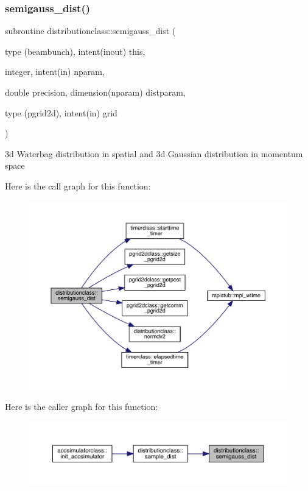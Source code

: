 \subsubsection{\texorpdfstring{semigauss\_dist()}{semigauss\_dist()}}
{\footnotesize\ttfamily subroutine distributionclass\+::semigauss\+\_\+dist (\begin{DoxyParamCaption}\item[{type (beambunch), intent(inout)}]{this,  }\item[{integer, intent(in)}]{nparam,  }\item[{double precision, dimension(nparam)}]{distparam,  }\item[{type (pgrid2d), intent(in)}]{grid }\end{DoxyParamCaption})}



3d Waterbag distribution in spatial and 3d Gaussian distribution in momentum space 

Here is the call graph for this function\+:\nopagebreak
\begin{figure}[H]
\begin{center}
\leavevmode
\includegraphics[width=350pt]{namespacedistributionclass_a5ae8e13c52291510b7b0b6fe333db73f_cgraph}
\end{center}
\end{figure}
Here is the caller graph for this function\+:\nopagebreak
\begin{figure}[H]
\begin{center}
\leavevmode
\includegraphics[width=350pt]{namespacedistributionclass_a5ae8e13c52291510b7b0b6fe333db73f_icgraph}
\end{center}
\end{figure}
\mbox{\label{namespacedistributionclass_a8125c1fdf424cfd4bad6cd74eb2d3946}} 

